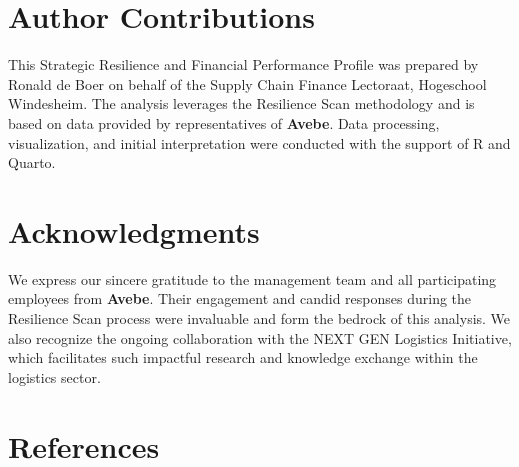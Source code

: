 \documentclass[
  oneside,
  open=any,
  fontsize=11pt]{scrbook}
\begin{document}
\chapter{Author Contributions}\label{author-contributions}

This Strategic Resilience and Financial Performance Profile was prepared
by Ronald de Boer on behalf of the Supply Chain Finance Lectoraat,
Hogeschool Windesheim. The analysis leverages the Resilience Scan
methodology and is based on data provided by representatives of
\textbf{Avebe}. Data processing, visualization, and initial
interpretation were conducted with the support of R and Quarto.

\chapter{Acknowledgments}\label{acknowledgments}

We express our sincere gratitude to the management team and all
participating employees from \textbf{Avebe}. Their engagement and candid
responses during the Resilience Scan process were invaluable and form
the bedrock of this analysis. We also recognize the ongoing
collaboration with the NEXT GEN Logistics Initiative, which facilitates
such impactful research and knowledge exchange within the logistics
sector.

\chapter{References}\label{references}

\label{refs}


\backmatter
\end{document}
